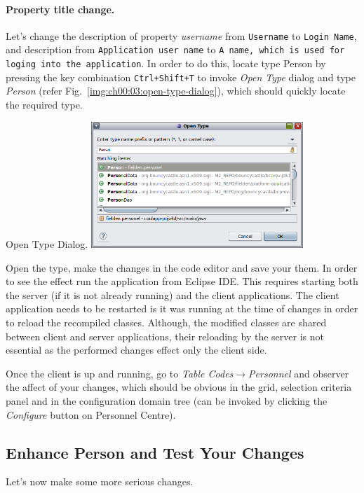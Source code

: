   \paragraph*{Property title change.}
  Let's change the description of property \emph{username} from \texttt{Username} to \texttt{Login Name}, and description from \texttt{Application user name} to \texttt{A name, which is used for loging into the application}.
  In order to do this, locate type Person by pressing the key combination \texttt{Ctrl+Shift+T} to invoke \emph{Open Type} dialog and type \emph{Person} (refer Fig.~\ref{img:ch00:03:open-type-dialog}), which should quickly locate the required type.

  \begin{image}{Open Type Dialog.}{\label{img:ch00:03:open-type-dialog}}
    \includegraphics[width=0.6\textwidth]{parts/00-part/chapters/02-making-changes/images/01-open-type-person.png}
  \end{image}

  Open the type, make the changes in the code editor and save your them.
  In order to see the effect run the application from Eclipse IDE.
  This requires starting both the server (if it is not already running) and the client applications.
  The client application needs to be restarted is it was running at the time of changes in order to reload the recompiled classes.
  Although, the modified classes are shared between client and server applications, their reloading by the server is not essential as the performed changes effect only the client side.
  
  Once the client is up and running, go to \emph{Table Codes}$\longrightarrow$\emph{Personnel} and observer the affect of your changes, which should be obvious in the grid, selection criteria panel and in the configuration domain tree (can be invoked by clicking the \emph{Configure} button on Personnel Centre).
  
\subsection{Enhance Person and Test Your Changes}
  Let's now make some more serious changes. 
  
